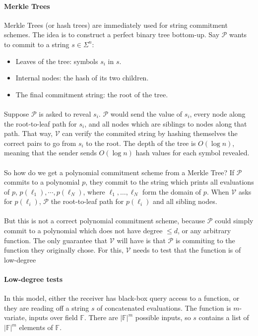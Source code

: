 \documentclass[11pt]{article}
\newcommand{\prover}{$\mathcal{P}$ }
\newcommand{\verifier}{$\mathcal{V}$ }
\begin{document}
\paragraph{Merkle Trees \cite{merkle79}} Merkle Trees (or hash trees) are immediately used for string commitment schemes. The idea is to construct a perfect binary tree bottom-up. Say \prover wants to commit to a string $s \in \Sigma^n$:
\begin{itemize}
    \item Leaves of the tree: symbols $s_i$ in $s$.
    \item Internal nodes: the hash of its two children.
    \item The final commitment string: the root of the tree.
\end{itemize}
\paragraph{} Suppose \prover is asked to reveal $s_i$. \prover would send the value of $s_i$, every node along the root-to-leaf path for $s_i$, and all nodes which are siblings to nodes along that path. That way, \verifier can verify the commited string by hashing themselves the correct pairs to go from $s_i$ to the root. The depth of the tree is $O(\log n)$, meaning that the sender sends $O(\log n)$ hash values for each symbol revealed.

\paragraph{} So how do we get a polynomial commitment scheme from a Merkle Tree? If \prover commits to a polynomial $p$, they commit to the string which prints all evaluations of $p$, $p(\ell_1), \cdots, p(\ell_N)$, where $\ell_1, \ldots, \ell_N$ form the domain of $p$. When \verifier asks for $p(\ell_i)$, \prover the root-to-leaf path for $p(\ell_i)$ and all sibling nodes.

\paragraph{} But this is not a correct polynomial commitment scheme, because \prover could simply commit to a polynomial which does not have degree $\leq d$, or any arbitrary function. The only guarantee that \verifier will have is that \prover is commiting to the function they originally chose. For this, \verifier needs to test that the function is of low-degree

\paragraph{Low-degree tests} In this model, either the receiver has black-box query access to a function, or they are reading off a string $s$ of concatenated evaluations. The function is $m$-variate, inputs over field $\mathbb{F}$. There are $|\mathbb{F}|^m$ possible inputs, so $s$ contains a list of $|\mathbb{F}|^m$ elements of $\mathbb{F}$.
\end{document}
